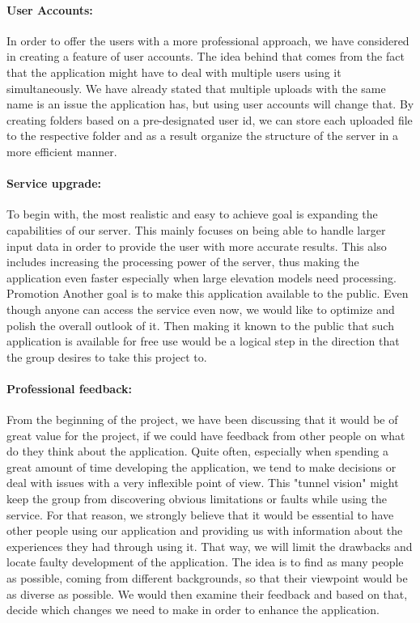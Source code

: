 \paragraph{User Accounts:} In order to offer the users with a more professional approach, we have considered in creating a feature of user accounts. The idea behind that comes from the fact that the application might have to deal with multiple users using it simultaneously. We have already stated that multiple uploads with the same name is an issue the application has, but using user accounts will change that. By creating folders based on a pre-designated user id, we can store each uploaded file to the respective folder and as a result organize the structure of the server in a more efficient manner.   

\paragraph{Service upgrade:} To begin with, the most realistic and easy to achieve goal is expanding the capabilities of our server. This mainly focuses on being able to handle larger input data in order to provide the user with more accurate results. This also includes increasing the processing power of the server, thus making the application even faster especially when large elevation models need processing. 
Promotion
Another goal is to make this application available to the public. Even though anyone can access the service even now, we would like to optimize and polish the overall outlook of it. Then making it known to the public that such application is available for free use would be a logical step in the direction that the group desires to take this project to.

\paragraph{Professional feedback:} From the beginning of the project, we have been discussing that it would be of great value for the project, if we could have feedback from other people on what do they think about the application. Quite often, especially when spending a great amount of time developing the application, we tend to make decisions or deal with issues with a very inflexible point of view. This "tunnel vision" might keep the group from discovering obvious limitations or faults while using the service. For that reason, we strongly believe that it would be essential to have other people using our application and providing us with information about the experiences they had through using it. That way, we will limit the drawbacks and locate faulty development of the application. The idea is to find as many people as possible, coming from different backgrounds, so that their viewpoint would be as diverse as possible. We would then examine their feedback and based on that, decide which changes we need to make in order to enhance  the application.

